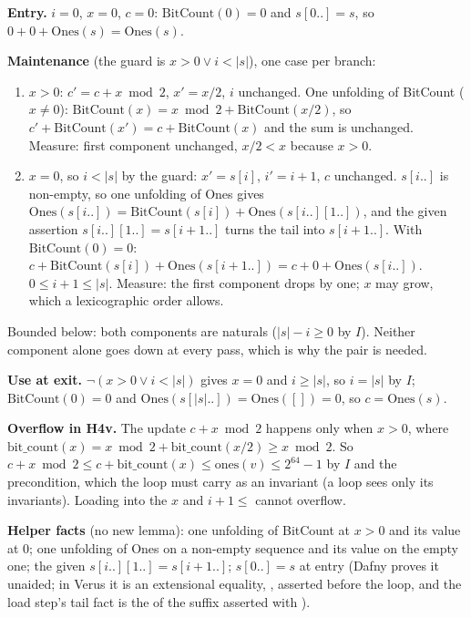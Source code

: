 \documentclass[11pt]{article}
\begin{document}
\textbf{Entry.} $i = 0$, $x = 0$, $c = 0$: $\mathrm{BitCount}(0) = 0$ and
$s[0..] = s$, so $0 + 0 + \mathrm{Ones}(s) = \mathrm{Ones}(s)$.

\textbf{Maintenance} (the guard is $x > 0 \vee i < |s|$), one case per branch:
\begin{enumerate}
\item $x > 0$: $c' = c + x \bmod 2$, $x' = x / 2$, $i$ unchanged. One
  unfolding of BitCount ($x \neq 0$): $\mathrm{BitCount}(x) = x \bmod 2 +
  \mathrm{BitCount}(x/2)$, so $c' + \mathrm{BitCount}(x') = c +
  \mathrm{BitCount}(x)$ and the sum is unchanged. Measure: first component
  unchanged, $x/2 < x$ because $x > 0$.
\item $x = 0$, so $i < |s|$ by the guard: $x' = s[i]$, $i' = i + 1$, $c$
  unchanged. $s[i..]$ is non-empty, so one unfolding of Ones gives
  $\mathrm{Ones}(s[i..]) = \mathrm{BitCount}(s[i]) + \mathrm{Ones}(s[i..][1..])$,
  and the given assertion $s[i..][1..] = s[i+1..]$ turns the tail into
  $s[i+1..]$. With $\mathrm{BitCount}(0) = 0$:
  $c + \mathrm{BitCount}(s[i]) + \mathrm{Ones}(s[i+1..]) = c + 0 +
  \mathrm{Ones}(s[i..])$. $0 \leq i + 1 \leq |s|$. Measure: the first
  component drops by one; $x$ may grow, which a lexicographic order allows.
\end{enumerate}
Bounded below: both components are naturals ($|s| - i \geq 0$ by $I$).
Neither component alone goes down at every pass, which is why the pair is
needed.

\textbf{Use at exit.} $\neg(x > 0 \vee i < |s|)$ gives $x = 0$ and $i \geq |s|$,
so $i = |s|$ by $I$; $\mathrm{BitCount}(0) = 0$ and $\mathrm{Ones}(s[|s|..])
= \mathrm{Ones}([]) = 0$, so $c = \mathrm{Ones}(s)$.

\textbf{Overflow in H4v.} The update $c + x \bmod 2$ happens only when
$x > 0$, where $\mathrm{bit\_count}(x) = x \bmod 2 + \mathrm{bit\_count}(x/2)
\geq x \bmod 2$. So $c + x \bmod 2 \leq c + \mathrm{bit\_count}(x) \leq
\mathrm{ones}(v) \leq 2^{64} - 1$ by $I$ and the precondition, which the loop
must carry as an invariant (a loop sees only its invariants). Loading
 into the  $x$ and $i + 1 \leq$  cannot
overflow.

\textbf{Helper facts} (no new lemma): one unfolding of BitCount at $x > 0$ and
its value at $0$; one unfolding of Ones on a non-empty sequence and its value
on the empty one; the given $s[i..][1..] = s[i+1..]$; $s[0..] = s$ at entry
(Dafny proves it unaided; in Verus it is an extensional equality,
, asserted before the loop, and the load
step's tail fact is the  of the suffix asserted with
\vrs{=~=}).
\end{document}
